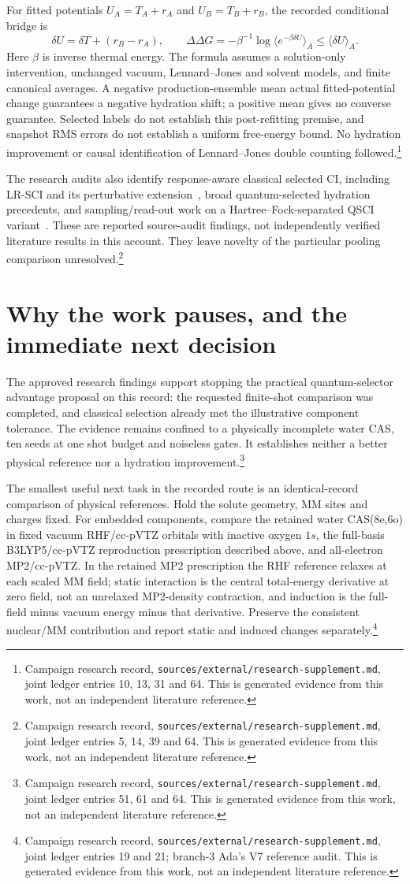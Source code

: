 \documentclass{article}
\newcommand{\record}[1]{\footnote{Campaign research record, \texttt{sources/external/research-supplement.md}, #1. This is generated evidence from this work, not an independent literature reference.}}
\begin{document}
For fitted potentials \(U_A=T_A+r_A\) and \(U_B=T_B+r_B\), the recorded conditional bridge is
\[
 \delta U=\delta T+(r_B-r_A),\qquad
 \Delta\Delta G=-\beta^{-1}\log\langle e^{-\beta\delta U}\rangle_A
 \leq\langle\delta U\rangle_A.
\]
Here \(\beta\) is inverse thermal energy. The formula assumes a solution-only intervention, unchanged vacuum, Lennard--Jones and solvent models, and finite canonical averages. A negative production-ensemble mean actual fitted-potential change guarantees a negative hydration shift; a positive mean gives no converse guarantee. Selected labels do not establish this post-refitting premise, and snapshot RMS errors do not establish a uniform free-energy bound. No hydration improvement or causal identification of Lennard--Jones double counting followed.\record{joint ledger entries 10, 13, 31 and 64}

The research audits also identify response-aware classical selected CI, including LR-SCI and its perturbative extension~\cite{LR,LRPT}, broad quantum-selected hydration precedents, and sampling/read-out work on a Hartree--Fock-separated QSCI variant~\cite{readout}. These are reported source-audit findings, not independently verified literature results in this account. They leave novelty of the particular pooling comparison unresolved.\record{joint ledger entries 5, 14, 39 and 64}

\section{Why the work pauses, and the immediate next decision}
The approved research findings support stopping the practical quantum-selector advantage proposal on this record: the requested finite-shot comparison was completed, and classical selection already met the illustrative component tolerance. The evidence remains confined to a physically incomplete water CAS, ten seeds at one shot budget and noiseless gates. It establishes neither a better physical reference nor a hydration improvement.\record{joint ledger entries 51, 61 and 64}

The smallest useful next task in the recorded route is an identical-record comparison of physical references. Hold the solute geometry, MM sites and charges fixed. For embedded components, compare the retained water CAS(8e,6o) in fixed vacuum RHF/cc-pVTZ orbitals with inactive oxygen \(1s\), the full-basis B3LYP5/cc-pVTZ reproduction prescription described above, and all-electron MP2/cc-pVTZ. In the retained MP2 prescription the RHF reference relaxes at each scaled MM field; static interaction is the central total-energy derivative at zero field, not an unrelaxed MP2-density contraction, and induction is the full-field minus vacuum energy minus that derivative. Preserve the consistent nuclear/MM contribution and report static and induced changes separately.\record{joint ledger entries 19 and 21; branch-3 Ada's V7 reference audit}
\end{document}

